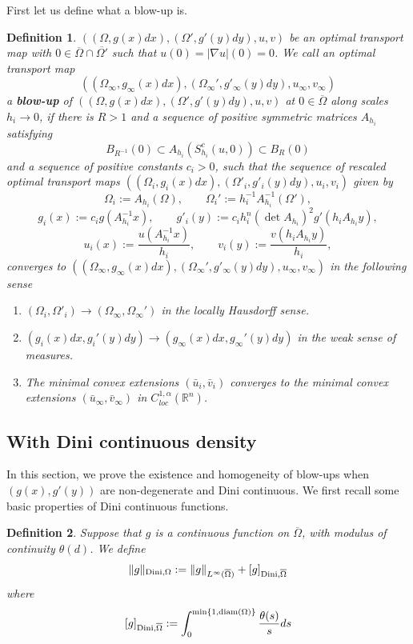 \documentclass[12pt,reqno]{amsart}
\newtheorem{defn}{Definition}[section]
\numberwithin{equation}{section}
\begin{document}
    First let us define what a blow-up is. 
    \begin{defn}
    $((\Omega, g(x)dx), (\Omega', g'(y)dy), u, v)$ be an optimal transport map with $0\in\overline{\Omega}\cap\overline{\Omega'}$ such that $u(0) = |\nabla u|(0) = 0$. We call an optimal transport map \[((\Omega_{\infty}, g_{\infty}(x)dx), (\Omega_{\infty}', g'_{\infty}(y)dy), u_{\infty}, v_{\infty})\] a {\bf blow-up} of $((\Omega, g(x)dx), (\Omega', g'(y)dy), u, v)$ at $0\in \overline\Omega$ along scales $h_i\to 0$, if there is $R>1$ and a sequence of positive symmetric matrices $A_{h_i}$ satisfying
    \[B_{R^{-1}}(0)\subset A_{h_i}(S_{h_i}^c(u, 0))\subset B_R(0)\]
    and a sequence of positive constants $c_i>0$, such that the sequence of rescaled optimal transport maps $((\Omega_{i}, g_i(x)dx), (\Omega'_{i}, g'_i(y)dy), u_i, v_i)$ given by
	\[\Omega_i := A_{h_i}(\Omega), \qquad \Omega_i' := h_i^{-1}A_{h_i}^{-1}(\Omega'),\]
	\[g_i(x) := c_ig(A_{h_i}^{-1}x), \qquad g'_i(y) := c_ih_i^n(\det A_{h_i})^2g'(h_iA_{h_i}y),\]
	\[u_i(x) := \frac{u(A_{h_i}^{-1}x)}{h_i}, \qquad v_i(y) := \frac{v(h_i A_{h_i}y)}{h_i},\]  converges to $((\Omega_{\infty}, g_{\infty}(x)dx), (\Omega_{\infty}', g'_{\infty}(y)dy), u_{\infty}, v_{\infty})$ in the following sense
    \begin{enumerate}
        \item $(\Omega_i, \Omega'_i)\to (\Omega_{\infty}, \Omega_{\infty}')$ in the locally Hausdorff sense. 
        \item $(g_i(x)dx, g_i'(y)dy)\to (g_{\infty}(x)dx, g_{\infty}'(y)dy)$ in the weak sense of measures. 
        \item The minimal convex extensions $(\bar u_i, \bar v_i)$ converges to the minimal convex extensions $(\bar u_{\infty}, \bar v_{\infty})$ in $C^{1, \alpha}_{loc}(\mathbb R^n)$. 
    \end{enumerate}
\end{defn}
    \subsection{With Dini continuous density}
    In this section, we prove the existence and homogeneity of blow-ups when $(g(x), g'(y))$ are non-degenerate and Dini continuous. We first recall some basic properties of Dini continuous functions.  

    \begin{defn}
        Suppose that $g$ is a continuous function on $\overline{\Omega}$, with modulus of continuity $\theta(d)$. We define
        \[
        \|g\|_{{\rm Dini},\Omega} := \|g\|_{L^{\infty}(\overline{\Omega})} + [g]_{{\rm Dini},\overline{\Omega}}
        \]
        where
        \[
        [g]_{{\rm Dini},\overline{\Omega}} := \int_0^{\min\{1, {\rm diam}(\Omega)\}} \frac{\theta(s)}{s}ds
        \]
    \end{defn}
\end{document}
